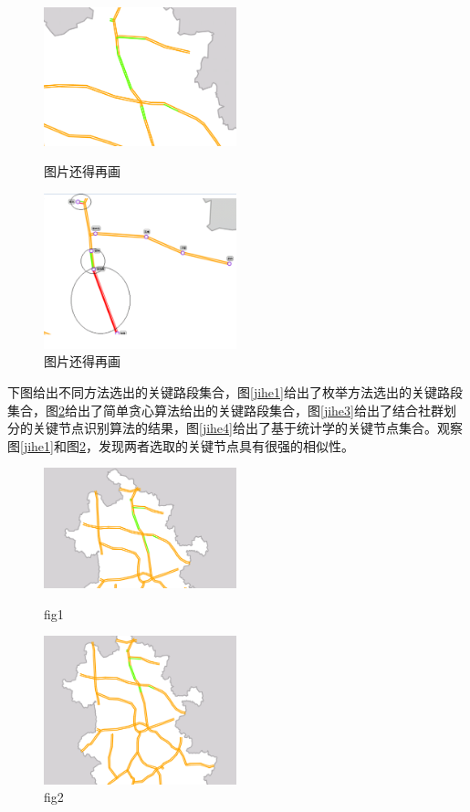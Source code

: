 				\begin{figure}
				\begin{minipage}{0.5\linewidth}
					\centering
					\includegraphics[width=2.2in]{picture/greedy02}
					\caption{图片还得再画}
					\label{fenqunend}
				\end{minipage}%
				\begin{minipage}{0.5\linewidth}
					\centering
					\includegraphics[width=2.2in]{picture/shequnhuafen}
					\caption{图片还得再画}
					\label{end}
				\end{minipage}
				\end{figure}

		下图给出不同方法选出的关键路段集合，图\ref{jihe1}给出了枚举方法选出的关键路段集合，图\ref{jihe2}给出了简单贪心算法给出的关键路段集合，图\ref{jihe3}给出了结合社群划分的关键节点识别算法的结果，图\ref{jihe4}给出了基于统计学的关键节点集合。观察图\ref{jihe1}和图\ref{jihe2}，发现两者选取的关键节点具有很强的相似性。

				\begin{figure}
				\begin{minipage}{0.5\linewidth}
					\centering
					\includegraphics[width=2.2in]{picture/meiju}
					\caption{fig1}
					\label{jihe1}
				\end{minipage}%
				\begin{minipage}{0.5\linewidth}
					\centering
					\includegraphics[width=2.2in]{picture/greedy01}
					\caption{fig2}
					\label{jihe2}
				\end{minipage}
				\end{figure}

